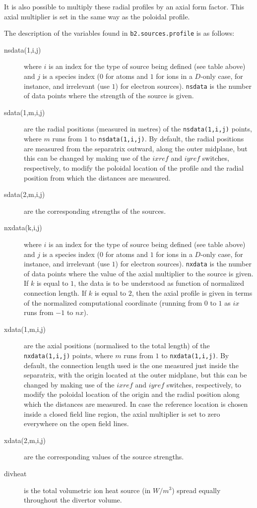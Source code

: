 \documentclass[a4paper,10pt]{report}
\begin{document}
It is also possible to multiply these radial profiles by an axial form factor.
This axial multiplier is set in the same way as the poloidal profile.

The description of the variables found in {\tt b2.sources.profile} is as follows:
\begin{description}
  \item[nsdata(1,i,j)] where $i$ is an index for the type of source
     being defined (see table above) and $j$ is a species index ($0$ for atoms and $1$
     for ions in a $D$-only case, for instance, and irrelevant (use $1$) for electron
     sources). {\tt nsdata} is the
     number of data points where the strength of the source is given.
  \item[sdata(1,m,i,j)] are the radial positions (measured in metres) of the
     {\tt nsdata(1,i,j)} points,
     where $m$ runs from $1$ to {\tt nsdata(1,i,j)}. By default, the radial positions are
     measured from the separatrix outward, along the outer midplane, but this can be changed by
     making use of the $ixref$ and $iyref$ switches, respectively, to modify the poloidal
     location of the profile and the radial position from which the distances are measured.
  \item[sdata(2,m,i,j)] are the corresponding strengths of the sources.
  \item[nxdata(k,i,j)] where $i$ is an index for the type of source
     being defined (see table above) and $j$ is a species index ($0$ for atoms and $1$
     for ions in a $D$-only case, for instance, and irrelevant (use $1$) for electron
     sources). {\tt nxdata} is the
     number of data points where the value of the axial multiplier to the source is given.
     If $k$ is equal to $1$, the data is to be understood as function of normalized
     connection length. If $k$ is equal to $2$, then the axial profile is given in terms
     of the normalized computational coordinate (running from $0$ to $1$ as $ix$ runs from
     $-1$ to $nx$).
  \item[xdata(1,m,i,j)] are the axial positions (normalised to the total length)
     of the {\tt nxdata(1,i,j)} points,
     where $m$ runs from $1$ to {\tt nxdata(1,i,j)}. By default, the connection length
     used is the one measured just inside the separatrix, with the origin
     located at the outer midplane, but this can be changed by
     making use of the $ixref$ and $iyref$ switches, respectively, to modify the poloidal
     location of the origin and the radial position along which the distances are measured.
     In case the reference location is chosen inside a closed field line region, the axial
     multiplier is set to zero everywhere on the open field lines.
  \item[xdata(2,m,i,j)] are the corresponding values of the source strengths.
  \item[divheat] is the total volumetric ion heat source (in $W/m^{3}$)
     spread equally throughout the divertor volume.
\end{description}
\end{document}
